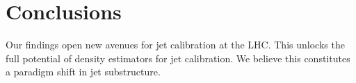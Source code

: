 \section{Conclusions}\label{sec:conclusions}

Our findings open new avenues for jet calibration at the LHC. This
unlocks the full potential of density estimators for jet calibration. We
believe this constitutes a paradigm shift in jet substructure.

